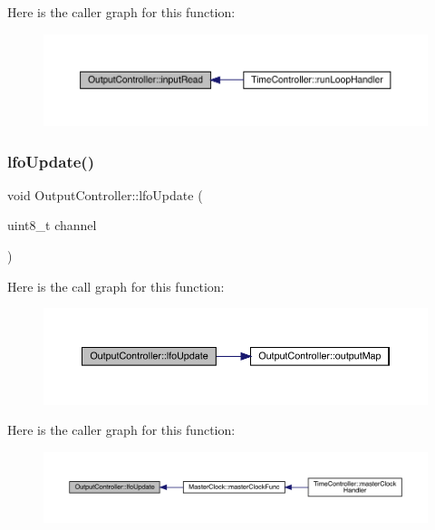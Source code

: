 Here is the caller graph for this function\+:
\nopagebreak
\begin{figure}[H]
\begin{center}
\leavevmode
\includegraphics[width=350pt]{class_output_controller_a67591d82e2c023450e42976bf68b1af1_icgraph}
\end{center}
\end{figure}
\mbox{\label{class_output_controller_a561d7c84d91dcba6cfd9cd8b587b749f}} 
\subsubsection{\texorpdfstring{lfo\+Update()}{lfoUpdate()}}
{\footnotesize\ttfamily void Output\+Controller\+::lfo\+Update (\begin{DoxyParamCaption}\item[{uint8\+\_\+t}]{channel }\end{DoxyParamCaption})}

Here is the call graph for this function\+:
\nopagebreak
\begin{figure}[H]
\begin{center}
\leavevmode
\includegraphics[width=350pt]{class_output_controller_a561d7c84d91dcba6cfd9cd8b587b749f_cgraph}
\end{center}
\end{figure}
Here is the caller graph for this function\+:
\nopagebreak
\begin{figure}[H]
\begin{center}
\leavevmode
\includegraphics[width=350pt]{class_output_controller_a561d7c84d91dcba6cfd9cd8b587b749f_icgraph}
\end{center}
\end{figure}
\mbox{\label{class_output_controller_afc6f2ff1d148a4ac60bc07b5829875eb}} 
